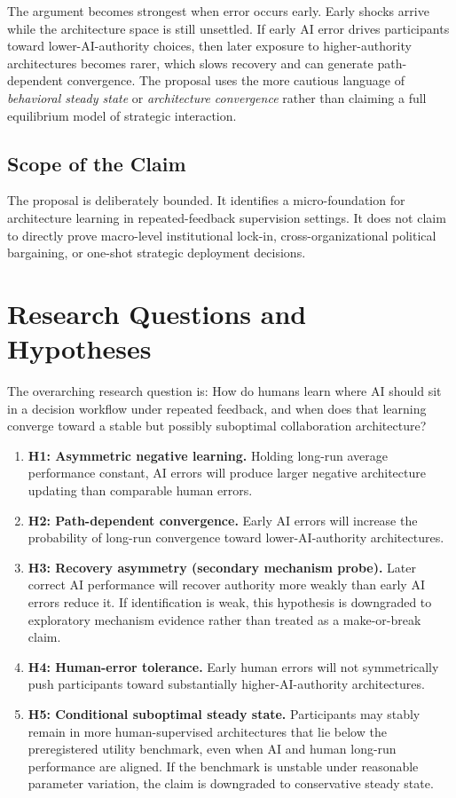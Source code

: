 \documentclass[man,natbib]{apa7}
\begin{document}
The argument becomes strongest when error occurs early. Early shocks arrive while the architecture space is still unsettled. If early AI error drives participants toward lower-AI-authority choices, then later exposure to higher-authority architectures becomes rarer, which slows recovery and can generate path-dependent convergence. The proposal uses the more cautious language of \textit{behavioral steady state} or \textit{architecture convergence} rather than claiming a full equilibrium model of strategic interaction.

\subsection{Scope of the Claim}

The proposal is deliberately bounded. It identifies a micro-foundation for architecture learning in repeated-feedback supervision settings. It does not claim to directly prove macro-level institutional lock-in, cross-organizational political bargaining, or one-shot strategic deployment decisions.

\section{Research Questions and Hypotheses}

The overarching research question is: How do humans learn where AI should sit in a decision workflow under repeated feedback, and when does that learning converge toward a stable but possibly suboptimal collaboration architecture?

\begin{enumerate}
  \item \textbf{H1: Asymmetric negative learning.} Holding long-run average performance constant, AI errors will produce larger negative architecture updating than comparable human errors.
  \item \textbf{H2: Path-dependent convergence.} Early AI errors will increase the probability of long-run convergence toward lower-AI-authority architectures.
  \item \textbf{H3: Recovery asymmetry (secondary mechanism probe).} Later correct AI performance will recover authority more weakly than early AI errors reduce it. If identification is weak, this hypothesis is downgraded to exploratory mechanism evidence rather than treated as a make-or-break claim.
  \item \textbf{H4: Human-error tolerance.} Early human errors will not symmetrically push participants toward substantially higher-AI-authority architectures.
  \item \textbf{H5: Conditional suboptimal steady state.} Participants may stably remain in more human-supervised architectures that lie below the preregistered utility benchmark, even when AI and human long-run performance are aligned. If the benchmark is unstable under reasonable parameter variation, the claim is downgraded to conservative steady state.
\end{enumerate}
\end{document}
